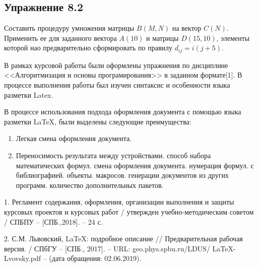 \subsection{\fontsize{14pt}{16.8pt}Упражнение 8.2}
\noindent
Составить процедуру умножения матрицы $B(M, N)$ на вектор $C(N)$. Применить ее для заданного вектора $A(10)$ и матрицы $D(15,10)$, элементы которой нао предварительно сформировать по правилу $d_{ij}=i(j+5)$.

\newpage
\begin{center}
\label{sec:close}
\end{center}
\par
\fontsize{14pt}{16.8pt}\selectfont
В рамках курсовой работы были оформлены упражнения по дисциплине <<Алгоритмизация и основы програмирования>> в заданном формате[1].
В процессе выполнения работы был изучен синтаксис и особенности языка разметки Latex. 
\par
\fontsize{14pt}{16.8pt}\selectfont
В процессе использования подхода оформления документа с помощью языка разметки LaTeX, были выделены следующие преимущества:
\begin{spacing}{0.9}
\fontsize{14pt}{16.8pt}\selectfont
\begin{enumerate} 
  \item Легкая смена оформления документа.
  \item Переносимость результата между устройствами.
  способ набора математических формул.
 смена оформления документа.
 нумерация формул.
 с библиографией.
 объекты.
 макросов.
 генерации документов из других программ.
 количество дополнительных пакетов.
\end{enumerate}
\end{spacing}

\newpage
\begin{center}
\end{center}
\par
1. Регламент содержания, оформления, организации выполнения и защиты курсовых проектов и курсовых работ / утвержден учебно-методическим советом / СПБПУ – [СПБ.,2018]. – 24 с.
\par
2. С.М. Львовский, LaTeX: подробное описание // Предварительная рабочая версия. / СПбГУ – [СПБ., 2017]. – URL: geo.phys.spbu.ru/LDUS/ LaTeX-Lvovsky.pdf
– (дата обращения: 02.06.2019).
